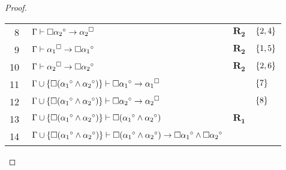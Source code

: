 \begin{tcolorbox}[enhanced jigsaw, breakable, sharp corners, colframe=black, colback=white, boxrule=0.5pt, left=1.5mm, right=1.5mm, top=1.5mm, bottom=1.5mm]
\begin{theorem}
\begin{proof}
\begin{xltabular}{\textwidth}{r | X l l}
            \scriptsize{\phantom{0}8}\phantom{ } & $\ \Gamma\vdash\nec{\alpha_2}^\circ\to{\alpha_2}^\medsquare$                                                                                                                                                                  & $\hyperref[modal.rule.2]{\mathbf{R_2}}$  & $\left\{2,4\right\}$\\[\rowskip]
            \scriptsize{\phantom{0}9}\phantom{ } & $\ \Gamma\vdash{\alpha_1}^\medsquare\to\nec{\alpha_1}^\circ$                                                                                                                                                                  & $\hyperref[modal.rule.2]{\mathbf{R_2}}$  & $\left\{1,5\right\}$\\[\rowskip]
            \scriptsize{10}\phantom{ }           & $\ \Gamma\vdash{\alpha_2}^\medsquare\to\nec{\alpha_2}^\circ$                                                                                                                                                                  & $\hyperref[modal.rule.2]{\mathbf{R_2}}$  & $\left\{2,6\right\}$\\[\rowskip]
            \scriptsize{11}\phantom{ }           & $\ \Gamma\cup\set{\nec({\alpha_1}^\circ\wedge{\alpha_2}^\circ)} \vdash \nec{\alpha_1}^\circ \to {\alpha_1}^\medsquare$                                                                                                        &                      & $\left\{7\right\}$\\[\rowskip]
            \scriptsize{12}\phantom{ }           & $\ \Gamma\cup\set{\nec({\alpha_1}^\circ\wedge{\alpha_2}^\circ)} \vdash \nec{\alpha_2}^\circ \to {\alpha_2}^\medsquare$                                                                                                        &                      & $\left\{8\right\}$\\[\rowskip]
            \scriptsize{13}\phantom{ }           & $\ \Gamma\cup\set{\nec({\alpha_1}^\circ\wedge{\alpha_2}^\circ)} \vdash \nec({\alpha_1}^\circ \wedge {\alpha_2}^\circ)$                                                                                                        & $\hyperref[modal.rule.1]{\mathbf{R_1}}$  & \\[\rowskip]
            \scriptsize{14}\phantom{ }           & $\ \Gamma\cup\set{\nec({\alpha_1}^\circ\wedge{\alpha_2}^\circ)} \vdash \nec({\alpha_1}^\circ \wedge {\alpha_2}^\circ) \to \nec{\alpha_1}^\circ \wedge \nec{\alpha_2}^\circ$                                                   &  & \\[\rowskip]

\end{xltabular}
\end{proof}
\end{theorem}
\end{tcolorbox}
